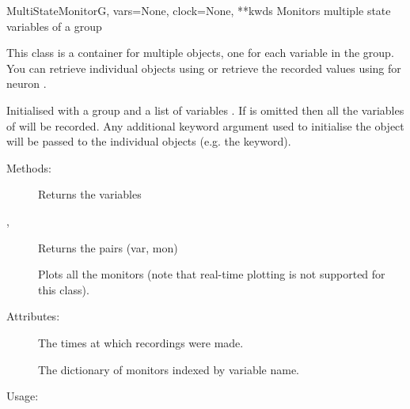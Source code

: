 \documentclass[letterpaper,10pt,english]{manual}
\begin{document}
\hypertarget{brian.MultiStateMonitor}{}\begin{classdesc}{MultiStateMonitor}{G, vars=None, clock=None, **kwds}
Monitors multiple state variables of a group

This class is a container for multiple \hyperlink{brian.StateMonitor}{} objects,
one for each variable in the group. You can retrieve individual
\hyperlink{brian.StateMonitor}{} objects using  or retrieve the
recorded values using  for neuron .

Initialised with a group  and a list of variables . If 
 is omitted then all the variables of  will be recorded.
Any additional keyword argument used to initialise the object will
be passed to the individual \hyperlink{brian.StateMonitor}{} objects (e.g. the
 keyword).

Methods:
\begin{description}
\item[] \leavevmode
Returns the variables

\item[, ] \leavevmode
Returns the pairs (var, mon)

\item[] \leavevmode
Plots all the monitors (note that real-time plotting is not supported
for this class).

\end{description}

Attributes:
\begin{description}
\item[] \leavevmode
The times at which recordings were made.

\item[] \leavevmode
The dictionary of monitors indexed by variable name.

\end{description}

Usage:


\end{classdesc}
\end{document}
